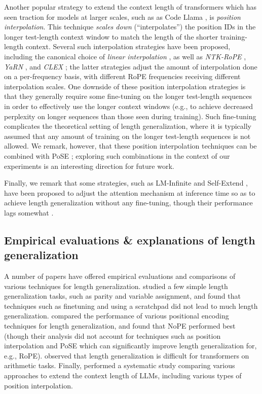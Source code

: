 Another popular strategy to extend the context length of transformers which has seen traction for models at larger scales, such as as Code Llama \cite{roziere_code_2024}, is \emph{position interpolation}. This technique \emph{scales down} (``interpolates'') the position IDs in the longer test-length context window to match the length of the shorter training-length context. Several such interpolation strategies have been proposed, including the canonical choice of \emph{linear interpolation} \cite{chen_extending_2023}, as well as \emph{NTK-RoPE} \cite{emozilla_dynamically_2023}, \emph{YaRN} \cite{peng_yarn_2023}, and \emph{CLEX} \cite{chen_clex_2024}; the latter strategies adjust the amount of interpolation done on a per-frequency basis, with different RoPE frequencies receiving different interpolation scales. One downside of these position interpolation strategies is that they generally require some fine-tuning on the longer test-length sequences in order to effectively use the longer context windows (e.g., to achieve decreased perplexity on longer sequences than those seen during training). Such fine-tuning complicates the theoretical setting of length generalization, where it is typically assumed that any amount of training on the longer test-length sequences is not allowed. We remark, however, that these position interpolation techniques can be combined with PoSE \cite{zhu_pose_2024,wu_never_2024}; exploring such combinations in the context of our experiments is an interesting direction for future work.

Finally, we remark that some strategies, such as LM-Infinite \cite{han_lminfinite_2024} and Self-Extend \cite{jin_llm_2024}, have been proposed to adjust the attention mechanism at inference time so as to achieve length generalization without any fine-tuning, though their performance lags somewhat \cite{lu_controlled_2024}. 





\subsection{Empirical evaluations \& explanations of length generalization}
A number of papers have offered empirical evaluations and comparisons of various techniques for length generalization. \citet{anil_exploring_2022} studied a few simple length generalization tasks, such as parity and variable assignment, and found that techniques such as finetuning and using a scratchpad did not lead to much length generalization. 
\citet{kazemnejad_impact_2023} compared the performance of various positional encoding techniques for length generalization, and found that NoPE performed best (though their analysis did not account for techniques such as position interpolation and PoSE which can significantly improve length generalization for, e.g., RoPE).  \citet{lee_teaching_2023} observed that length generalization is difficult for transformers on arithmetic tasks. 
Finally, \citet{lu_controlled_2024} performed a systematic study comparing various approaches to extend the context length of LLMs, including various types of position interpolation. 


